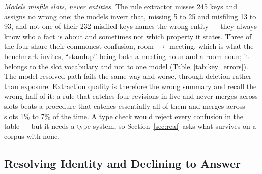 \documentclass{article} %
\begin{document}
\emph{Models misfile slots, never entities.} The rule extractor misses 245 keys and assigns no wrong one; the models invert that, missing 5 to 25 and misfiling 13 to 93, and not one of their 232 misfiled keys names the wrong entity --- they always know who a fact is about and sometimes not which property it states. Three of the four share their commonest confusion, room $\to$ meeting, which is what the benchmark invites, ``standup'' being both a meeting noun and a room noun; it belongs to the slot vocabulary and not to one model (Table~\ref{tab:key_errors}). The model-resolved path fails the same way and worse, through deletion rather than exposure. Extraction quality is therefore the wrong summary and recall the wrong half of it: a rule that catches four revisions in five and never merges across slots beats a procedure that catches essentially all of them and merges across slots 1\% to 7\% of the time. A type check would reject every confusion in the table --- but it needs a type system, so Section~\ref{sec:real} asks what survives on a corpus with none.

\subsection{Resolving Identity and Declining to Answer}
\label{sec:idresults}
\end{document}
